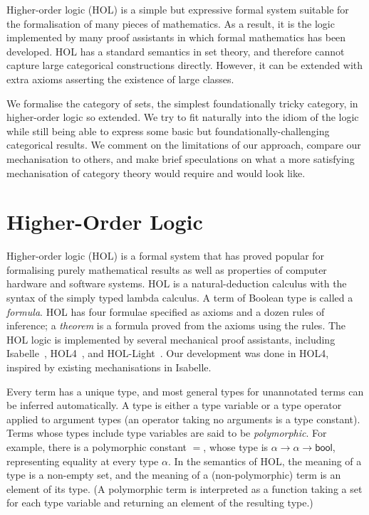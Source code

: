 \documentclass[twoside,titlepage,11pt]{article}
\begin{document}
Higher-order logic (HOL) is a simple but expressive formal system suitable for the formalisation of many pieces of mathematics.
As a result, it is the logic implemented by many proof assistants in which formal mathematics has been developed.
HOL has a standard semantics in set theory, and therefore cannot capture large categorical constructions directly.
However, it can be extended with extra axioms asserting the existence of large classes.

We formalise the category of sets, the simplest foundationally tricky category, in higher-order logic so extended.
We try to fit naturally into the idiom of the logic while still being able to express some basic but foundationally-challenging categorical results.
We comment on the limitations of our approach, compare our mechanisation to others, and make brief speculations on what a more satisfying mechanisation of category theory would require and would look like.
\section{Higher-Order Logic}%
\newcommand{\bool}{\ensuremath{\mathsf{bool}}}
Higher-order logic (HOL) is a formal system that has proved popular for formalising purely mathematical results as well as properties of computer hardware and software systems.
HOL is a natural-deduction calculus with the syntax of the simply typed lambda calculus.
A term of Boolean type is called a \emph{formula}.
HOL has four formulae specified as axioms and a dozen rules of inference; a \emph{theorem} is a formula proved from the axioms using the rules.
The HOL logic is implemented by several mechanical proof assistants, including Isabelle~\cite{DBLP:conf/tphol/WenzelPN08}, HOL4~\cite{DBLP:conf/tphol/SlindN08}, and HOL-Light~\cite{DBLP:conf/tphol/Harrison09a}.
Our development was done in HOL4, inspired by existing mechanisations \cite{Katovsky,DBLP:journals/entcs/OKeefe04} in Isabelle.

Every term has a unique type, and most general types for unannotated terms can be inferred automatically.
A type is either a type variable or a type operator applied to argument types (an operator taking no arguments is a type constant).
Terms whose types include type variables are said to be \emph{polymorphic}.
For example, there is a polymorphic constant $=$, whose type is $\alpha\to\alpha\to\bool$, representing equality at every type $\alpha$.
In the semantics of HOL, the meaning of a type is a non-empty set, and the meaning of a (non-polymorphic) term is an element of its type.
(A polymorphic term is interpreted as a function taking a set for each type variable and returning an element of the resulting type.)
\end{document}
